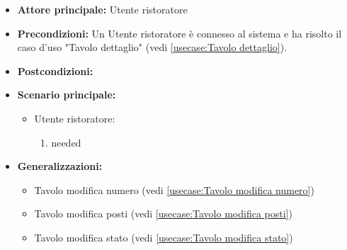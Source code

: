 \label{usecase:Tavolo modifica}
\begin{itemize}
\item \textbf{Attore principale:} Utente ristoratore
\item \textbf{Precondizioni:}
Un Utente ristoratore è connesso al sistema e ha risolto il caso d'uso "Tavolo dettaglio" (vedi \autoref{usecase:Tavolo dettaglio}).
\item \textbf{Postcondizioni:}
\item \textbf{Scenario principale:}
\begin{itemize}
\item Utente ristoratore:
\begin{enumerate}
\item needed
\end{enumerate}
\end{itemize}
\item \textbf{Generalizzazioni:}
\begin{itemize}
\item Tavolo modifica numero (vedi \autoref{usecase:Tavolo modifica numero})\item Tavolo modifica posti (vedi \autoref{usecase:Tavolo modifica posti})\item Tavolo modifica stato (vedi \autoref{usecase:Tavolo modifica stato})
\end{itemize}
\end{itemize}
